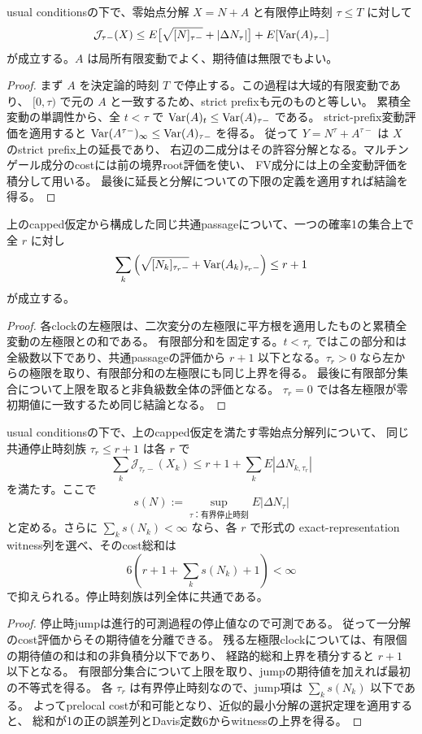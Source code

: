 \begin{lemma}
usual conditionsの下で、零始点分解 $X=N+A$ と有限停止時刻 $\tau\le T$ に対して
\[
 \mathcal J_{\tau-}(X)
 \le E\bigl[\sqrt{[N]_{\tau-}}+|\Delta N_\tau|\bigr]
       +E[\operatorname{Var}(A)_{\tau-}]
\]
が成立する。$A$ は局所有限変動でよく、期待値は無限でもよい。
\end{lemma}
\begin{proof}
まず $A$ を決定論的時刻 $T$ で停止する。この過程は大域的有限変動であり、
$[0,\tau)$ で元の $A$ と一致するため、strict prefixも元のものと等しい。
累積全変動の単調性から、全 $t<\tau$ で $\operatorname{Var}(A)_t\le\operatorname{Var}(A)_{\tau-}$ である。
strict-prefix変動評価を適用すると
$\operatorname{Var}(A^{\tau-})_\infty\le\operatorname{Var}(A)_{\tau-}$ を得る。
従って $Y=N^\tau+A^{\tau-}$ は $X$ のstrict prefix上の延長であり、
右辺の二成分はその許容分解となる。マルチンゲール成分のcostには前の境界root評価を使い、
FV成分には上の全変動評価を積分して用いる。
最後に延長と分解についての下限の定義を適用すれば結論を得る。
\end{proof}
\begin{lemma}[共通passageにおける左極限の総和]
上のcapped仮定から構成した同じ共通passageについて、一つの確率1の集合上で全 $r$ に対し
\[
 \sum_k\left(\sqrt{[N_k]_{\tau_r-}}+\operatorname{Var}(A_k)_{\tau_r-}\right)\le r+1
\]
が成立する。
\end{lemma}
\begin{proof}
各clockの左極限は、二次変分の左極限に平方根を適用したものと累積全変動の左極限との和である。
有限部分和を固定する。$t<\tau_r$ ではこの部分和は全級数以下であり、共通passageの評価から
$r+1$ 以下となる。$\tau_r>0$ なら左からの極限を取り、有限部分和の左極限にも同じ上界を得る。
最後に有限部分集合について上限を取ると非負級数全体の評価となる。
$\tau_r=0$ では各左極限が零初期値に一致するため同じ結論となる。
\end{proof}
\begin{lemma}[共通局所化によるcostとwitnessの和可能性]
usual conditionsの下で、上のcapped仮定を満たす零始点分解列について、
同じ共通停止時刻族 $\tau_r\le r+1$ は各 $r$ で
\[
 \sum_k\mathcal J_{\tau_r-}(X_k)
 \le r+1+\sum_k E|\Delta N_{k,\tau_r}|
\]
を満たす。ここで
\[
 s(N):=\sup_{\tau\text{：有界停止時刻}}E|\Delta N_\tau|
\]
と定める。さらに $\sum_k s(N_k)<\infty$ なら、各 $r$ で形式の
exact-representation witness列を選べ、そのcost総和は
\[
 6\left(r+1+\sum_k s(N_k)+1\right)<\infty
\]
で抑えられる。停止時刻族は列全体に共通である。
\end{lemma}
\begin{proof}
停止時jumpは進行的可測過程の停止値なので可測である。
従って一分解のcost評価からその期待値を分離できる。
残る左極限clockについては、有限個の期待値の和は和の非負積分以下であり、
経路的総和上界を積分すると $r+1$ 以下となる。
有限部分集合について上限を取り、jumpの期待値を加えれば最初の不等式を得る。
各 $\tau_r$ は有界停止時刻なので、jump項は $\sum_k s(N_k)$ 以下である。
よってprelocal costが和可能となり、近似的最小分解の選択定理を適用すると、
総和が1の正の誤差列とDavis定数6からwitnessの上界を得る。
\end{proof}
